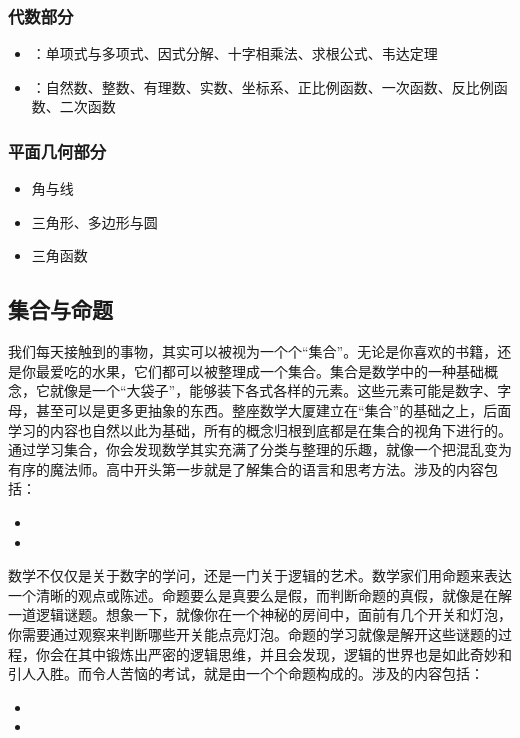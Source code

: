 \subsubsection{代数部分}

\begin{itemize}
\item {}：单项式与多项式、因式分解、十字相乘法、求根公式、韦达定理
\item {}：自然数、整数、有理数、实数、坐标系、正比例函数、一次函数、反比例函数、二次函数
\end{itemize}

\subsubsection{平面几何部分}

\begin{itemize}
\item 角与线
\item 三角形、多边形与圆
\item 三角函数
\end{itemize}

\subsection{集合与命题}

我们每天接触到的事物，其实可以被视为一个个“集合”。无论是你喜欢的书籍，还是你最爱吃的水果，它们都可以被整理成一个集合。集合是数学中的一种基础概念，它就像是一个“大袋子”，能够装下各式各样的元素。这些元素可能是数字、字母，甚至可以是更多更抽象的东西。整座数学大厦建立在“集合”的基础之上，后面学习的内容也自然以此为基础，所有的概念归根到底都是在集合的视角下进行的。通过学习集合，你会发现数学其实充满了分类与整理的乐趣，就像一个把混乱变为有序的魔法师。高中开头第一步就是了解集合的语言和思考方法。涉及的内容包括：

\begin{itemize}
\item {}
\item {}
\end{itemize}

数学不仅仅是关于数字的学问，还是一门关于逻辑的艺术。数学家们用命题来表达一个清晰的观点或陈述。命题要么是真要么是假，而判断命题的真假，就像是在解一道逻辑谜题。想象一下，就像你在一个神秘的房间中，面前有几个开关和灯泡，你需要通过观察来判断哪些开关能点亮灯泡。命题的学习就像是解开这些谜题的过程，你会在其中锻炼出严密的逻辑思维，并且会发现，逻辑的世界也是如此奇妙和引人入胜。而令人苦恼的考试，就是由一个个命题构成的。涉及的内容包括：
\begin{itemize}
\item {}
\item {}
\end{itemize}

